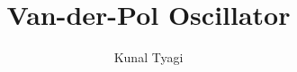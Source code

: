 \documentclass[12pt, a4paper]{article}
\title{Van-der-Pol Oscillator}
\author{Kunal Tyagi}
\begin{document}
\maketitle




{}
\end{document}
